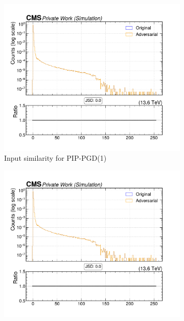 \begin{figure}[htbp]
  \centering
  \begin{subfigure}[t]{0.32\textwidth}
    \includegraphics[width=\linewidth]{media/output/features/compare/combined_it_1/cmp_cpf_arr_Cpfcan_chi2.pdf}
    \caption*{Input similarity for PIP-PGD(1)}
  \end{subfigure}\hfill
  \begin{subfigure}[t]{0.32\textwidth}
    \includegraphics[width=\linewidth]{media/output/features/compare/combined_it_2/cmp_cpf_arr_Cpfcan_chi2.pdf}

\end{subfigure}
\end{figure}
